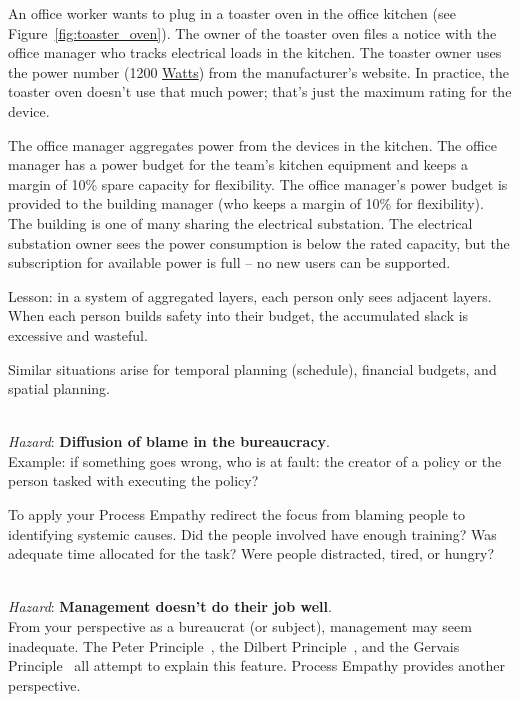 \begin{mdframed}[frametitle={Layers of Margins},frametitlerule=true,frametitlealignment=\centering]
An office worker wants to plug in a toaster oven in the office kitchen (see Figure~\ref{fig:toaster_oven}). The owner of the toaster oven files a notice with the office manager who tracks electrical loads in the kitchen. 
The toaster owner uses the power number (1200 \href{https://en.wikipedia.org/wiki/Watt}{Watts}) 
%
from the manufacturer's website. In practice, the toaster oven doesn't  use that much power; that's just the maximum rating for the device. 

The office manager aggregates power from the devices in the kitchen. The office manager has a power budget for the team's kitchen equipment and keeps a margin of 10\% spare capacity for flexibility. The office manager's power budget is provided to the building manager (who keeps a margin of 10\% for flexibility). The building is one of many sharing the electrical substation. The electrical substation owner sees the power consumption is below the rated capacity, but the subscription for available power is full -- no new users can be supported.
\end{mdframed}
Lesson: in a system of aggregated layers, each person only sees adjacent layers. When each person builds safety into their budget, the accumulated slack is excessive and wasteful.

Similar situations arise for temporal planning (schedule), financial budgets, and spatial planning. 


\ \\
\textit{Hazard}: \textbf{Diffusion of blame in the bureaucracy}. \\
Example: if something goes wrong, who is at fault: the creator of a policy or the person tasked with executing the policy?

To apply your Process Empathy redirect the focus from blaming people to identifying systemic causes. Did the people involved have enough training? Was adequate time allocated for the task? Were people distracted, tired, or hungry? 

\ \\
\textit{Hazard}: \textbf{Management doesn't do their job well}. \\
From your perspective as a bureaucrat (or subject), management may seem inadequate. The Peter Principle~\cite{1970_Peter}, the Dilbert Principle~\cite{1997_Adams}, and the Gervais Principle~\cite{2009_Rao} all attempt to explain this feature. Process Empathy provides another perspective. 


